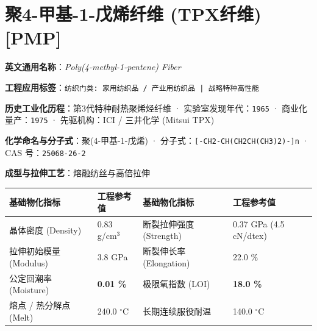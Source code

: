\documentclass[11pt,openright,twoside,UTF8]{ctexbook}
\begin{document}
\section{聚4-甲基-1-戊烯纤维 (TPX纤维) [PMP]}
\label{sec:pmp}

\noindent\textbf{英文通用名称}：\textit{Poly(4-methyl-1-pentene) Fiber}\par
\noindent\textbf{工程应用标签}：\texttt{纺织门类: 家用纺织品 / 产业用纺织品 | 战略特种高性能}\par
\noindent\textbf{历史工业化历程}：第3代特种耐热聚烯烃纤维 · 实验室发现年代：\texttt{1965} · 商业化量产：\texttt{1975} · 先驱机构：ICI / 三井化学 (Mitsui TPX)\par
\noindent\textbf{化学命名与分子式}：聚(4-甲基-1-戊烯) · 分子式：\texttt{[-CH2-CH(CH2CH(CH3)2)-]n} · CAS 号：\texttt{25068-26-2}\par
\noindent\textbf{成型与拉伸工艺}：熔融纺丝与高倍拉伸\par

\vspace{0.15cm}
\begin{center}
\small
\begin{tabularx}{\textwidth}{p{3.8cm}Xp{3.8cm}X}
\toprule
\textbf{基础物化指标} & \textbf{工程参考值} & \textbf{基础物化指标} & \textbf{工程参考值} \\
\midrule
晶体密度 (Density) & 0.83 g/cm$^3$ & 断裂拉伸强度 (Strength) & 0.37 GPa (4.5 cN/dtex) \\
拉伸初始模量 (Modulus) & 3.8 GPa & 断裂伸长率 (Elongation) & 22.0 \% \\
公定回潮率 (Moisture) & \textbf{0.01 \%} & 极限氧指数 (LOI) & \textbf{18.0 \%} \\
熔点 / 热分解点 (Melt) & 240.0 $^\circ\mathrm{C}$ & 长期连续服役耐温 & 140.0 $^\circ\mathrm{C}$ \\
\bottomrule
\end{tabularx}
\end{center}
\vspace{0.15cm}
\end{document}
